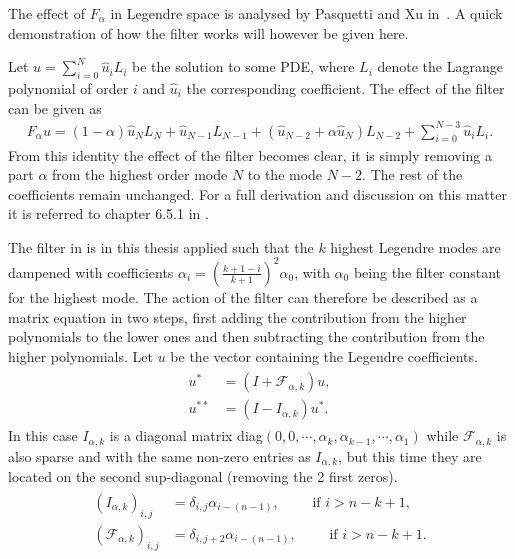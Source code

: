 The effect of $F_{\alpha}$ in Legendre space is analysed
by Pasquetti and Xu in~\cite{Pasquetti}. A quick demonstration of 
how the filter works will however be given here. 

Let $u = \sum_{i=0}^{N} \hat{u}_i L_i$ be the solution to some PDE, where $L_i$ denote the Lagrange
polynomial of order $i$ and $\hat{u}_i$ the corresponding coefficient. The effect of the filter
can be given as 
%
\begin{align}
    F_{\alpha} u = 
    (1-\alpha)\hat{u}_{N}L_{N}
    +\hat{u}_{N-1}L_{N-1} +
    (\hat{u}_{N-2}+\alpha \hat{u}_{N})L_{N-2}
    +\sum_{i=0}^{N-3}\hat{u}_{i}L_{i}.
    \label{eq:filtereffect}
\end{align}
%
From this identity the effect of the filter becomes clear, it is simply removing a part $\alpha $
from the highest order mode $N$ to the mode $N-2$. The rest of the coefficients remain unchanged.
For a full derivation and discussion on this matter it is referred to chapter 6.5.1 in 
\cite{Karniadakis}.

The filter in  is in this thesis applied such that the $k$ highest Legendre modes
are dampened with coefficients $\alpha_i = (\frac{k+1-i}{k+1})^2\alpha_0 $, with $\alpha_0$ being the filter constant
for the highest mode. The action of the filter can therefore be described as 
a matrix equation in two steps, first adding the contribution from the higher polynomials to the 
lower ones and then subtracting the contribution from the higher polynomials. Let $u$ be the 
vector containing the Legendre coefficients.
\begin{align}
    \begin{split}
    u^* &=(I+\mathcal{F}_{\alpha,k})u, \\
    u^{**} &= (I-I_{\alpha,k})u^*.
    \end{split}
    \label{eq:filterstepwise}
\end{align}
In this case $I_{\alpha,k}$ is a diagonal matrix 
diag$(0,0,\cdots,\alpha_k,\alpha_{k-1},\cdots,\alpha_1)$ 
while $\mathcal{F}_{\alpha,k}$ is also sparse and with the same non-zero entries as $I_{\alpha,k}$,
but this time they are located on the second sup-diagonal (removing the 2 first zeros). 
\begin{align}
    \begin{split}
        (I_{\alpha,k})_{i,j} &= \delta_{i,j}\alpha_{i-(n-1)}, \qquad \text{ if } i > n-k+1, \\
     (\mathcal{F}_{\alpha,k})_{i,j} &= \delta_{i,j+2}\alpha_{i-(n-1)}, \qquad \text{ if } i > n-k+1.
    \end{split}
    \label{eq:helpmatrices}
\end{align}

